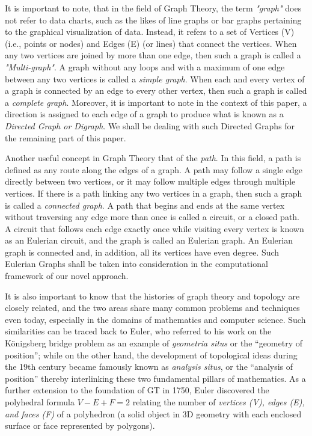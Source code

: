 It is important to note, that in the field of Graph Theory, the term \textit{"graph"} does not refer to data charts, such as the likes of line graphs or bar graphs pertaining to the graphical visualization of data. Instead, it refers to a set of Vertices (V) (i.e., points or nodes) and Edges (E) (or lines) that connect the vertices. When any two vertices are joined by more than one edge, then such a graph is called a \textit{"Multi-graph"}. \cite{01.14_HDMultigraphs}\cite{01.13_GTBackground} A graph without any loops and with a maximum of one edge between any two vertices is called a \textit{simple graph}. When each and every vertex of a graph is connected by an edge to every other vertex, then such a  graph is called a \textit{complete graph}. Moreover, it is important to note in the context of this paper, a direction is assigned to each edge of a graph to produce what is known as a \textit{Directed Graph or Digraph}.\cite{20.0_2013AlgebraOfDAGs} We shall be dealing with such Directed Graphs for the remaining part of this paper.

Another useful concept in Graph Theory that of the \textit{path}. In this field, a path is defined as any route along the edges of a graph.\cite{01.13_GTBackground} A path may follow a single edge directly between two vertices, or it may follow multiple edges through multiple vertices.\cite{01.6_GTIntro} If there is a path linking any two vertices in a graph, then such a graph is called a \textit{connected graph}. A path that begins and ends at the same vertex without traversing any edge more than once is called a circuit, or a closed path. A circuit that follows each edge exactly once while visiting every vertex is known as an Eulerian circuit, and the graph is called an Eulerian graph. An Eulerian graph is connected and, in addition, all its vertices have even degree.\cite{01.16_EulerianGraphs} \cite{01.17_EulerianGraphOrientations} Such Eulerian Graphs shall be taken into consideration in the computational framework of our novel approach.

It is also important to know that the histories of graph theory and topology are closely related, and the two areas share many common problems and techniques even today, \cite{01.12_2013TopoHistHandbook} \cite{01.10_2001HistoryofGT} especially in the domains of mathematics and computer science. Such similarities can be traced back to Euler, who referred to his work on the Königsberg bridge problem as an example of \textit{geometria situs} or the “geometry of position”; while on the other hand, the development of topological ideas during  the 19th century became famously known as \textit{analysis situs}, or the “analysis of position” thereby interlinking these two fundamental pillars of mathematics.\cite{01.13_GTBackground}\cite{01.14_HDMultigraphs} As a further extension to the foundation of GT in 1750, Euler discovered the polyhedral formula $V - E + F = 2$ relating the number of \textit{vertices (V), edges (E), and faces (F)} of a polyhedron (a solid object in 3D geometry with each enclosed surface or face represented by polygons). \cite{01.12_2013TopoHistHandbook}\cite{01.16_EulerianGraphs}

